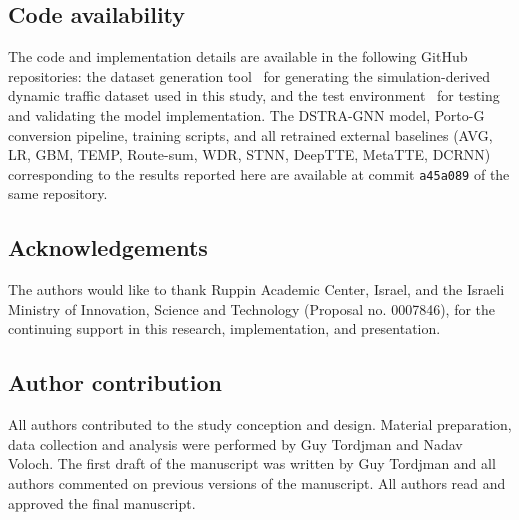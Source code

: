 \subsection*{Code availability}
The code and implementation details are available in the following GitHub repositories: the dataset generation tool~\cite{sumo_data_generator} for generating the simulation-derived dynamic traffic dataset used in this study, and the test environment~\cite{trafficlab} for testing and validating the model implementation. The DSTRA-GNN model, Porto-G conversion pipeline, training scripts, and all retrained external baselines (AVG, LR, GBM, TEMP, Route-sum, WDR, STNN, DeepTTE, MetaTTE, DCRNN) corresponding to the results reported here are available at commit \texttt{a45a089} of the same repository.

\subsection*{Acknowledgements}
The authors would like to thank Ruppin Academic Center, Israel, and the Israeli Ministry of Innovation, Science and Technology (Proposal no. 0007846), for the continuing support in this research, implementation, and presentation.

\subsection*{Author contribution}
All authors contributed to the study conception and design. Material preparation, data collection and analysis were performed by Guy Tordjman and Nadav Voloch. The first draft of the manuscript was written by Guy Tordjman and all authors commented on previous versions of the manuscript. All authors read and approved the final manuscript.
